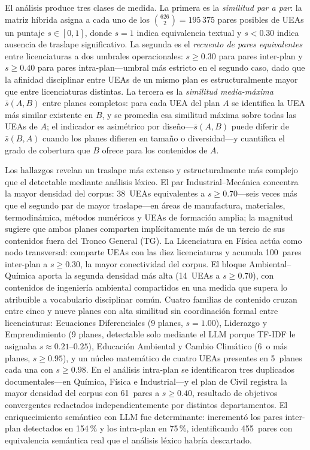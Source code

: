 \documentclass[11pt,a4paper]{article}
\begin{document}
El análisis produce tres clases de medida.
La primera es la \textit{similitud par a par}: la matriz híbrida asigna a cada uno de los $\binom{626}{2} = 195\,375$ pares posibles de UEAs un puntaje $s \in [0,1]$, donde $s = 1$ indica equivalencia textual y $s < 0.30$ indica ausencia de traslape significativo.
La segunda es el \textit{recuento de pares equivalentes} entre licenciaturas a dos umbrales operacionales: $s \geq 0.30$ para pares inter-plan y $s \geq 0.40$ para pares intra-plan---umbral más estricto en el segundo caso, dado que la afinidad disciplinar entre UEAs de un mismo plan es estructuralmente mayor que entre licenciaturas distintas.
La tercera es la \textit{similitud media-máxima} $\bar{s}(A,B)$ entre planes completos: para cada UEA del plan $A$ se identifica la UEA más similar existente en $B$, y se promedia esa similitud máxima sobre todas las UEAs de $A$; el indicador es asimétrico por diseño---$\bar{s}(A,B)$ puede diferir de $\bar{s}(B,A)$ cuando los planes difieren en tamaño o diversidad---y cuantifica el grado de cobertura que $B$ ofrece para los contenidos de $A$.

Los hallazgos revelan un traslape más extenso y estructuralmente más complejo que el detectable mediante análisis léxico.
El par Industrial--Mecánica concentra la mayor densidad del corpus: 38~UEAs equivalentes a $s \geq 0.70$---seis veces más que el segundo par de mayor traslape---en áreas de manufactura, materiales, termodinámica, métodos numéricos y UEAs de formación amplia; la magnitud sugiere que ambos planes comparten implícitamente más de un tercio de sus contenidos fuera del Tronco General (TG).
La Licenciatura en Física actúa como nodo transversal: comparte UEAs con las diez licenciaturas y acumula 100~pares inter-plan a $s \geq 0.30$, la mayor conectividad del corpus.
El bloque Ambiental--Química aporta la segunda densidad más alta (14~UEAs a $s \geq 0.70$), con contenidos de ingeniería ambiental compartidos en una medida que supera lo atribuible a vocabulario disciplinar común.
Cuatro familias de contenido cruzan entre cinco y nueve planes con alta similitud sin coordinación formal entre licenciaturas: Ecuaciones Diferenciales (9 planes, $s = 1.00$), Liderazgo y Emprendimiento (9 planes, detectable solo mediante el LLM porque TF-IDF le asignaba $s \approx 0.21$--$0.25$), Educación Ambiental y Cambio Climático (6~o más planes, $s \geq 0.95$), y un núcleo matemático de cuatro UEAs presentes en 5~planes cada una con $s \geq 0.98$.
En el análisis intra-plan se identificaron tres duplicados documentales---en Química, Física e Industrial---y el plan de Civil registra la mayor densidad del corpus con 61~pares a $s \geq 0.40$, resultado de objetivos convergentes redactados independientemente por distintos departamentos.
El enriquecimiento semántico con LLM fue determinante: incrementó los pares inter-plan detectados en 154\,\% y los intra-plan en 75\,\%, identificando 455~pares con equivalencia semántica real que el análisis léxico habría descartado.
\end{document}
